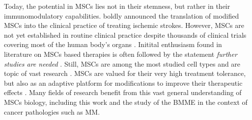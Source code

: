 

Today, the potential in \acp{MSC} lies not in their stemness, but rather in their
immunomodulatory capabilities.
\citet{chenTreatmentIschemicStroke2022} boldly announced the translation of
modified \acp{MSC} into the clinical practice of treating ischemic strokes.
However, \acp{MSC} are not yet established in routine clinical practice despite
thousands of clinical trials covering most of the human body's organs
\cite{abdelrazikMesenchymalStemCells2023}. Initital enthusiasm found in
literature on \acp{MSC} based therapies is often followed by the statement
\emph{further studies are needed}
\cite{abdelrazikMesenchymalStemCells2023,monivasgallegoMesenchymalStemCell2024}.
Still, \acp{MSC} are among the most studied cell types and are topic of
vast research \cite{abdelrazikMesenchymalStemCells2023}. \acp{MSC} are valued
for their very high treatment tolerance, but also as an adaptive platform for
modifications to improve their therapeutic effects
\cite{dsouzaMesenchymalStemStromal2015}. Many fields of research benefit from
this vast general understanding of \acp{MSC} biology, including this work and
the study of the \ac{BMME} in the context of cancer pathologies such as \ac{MM}.






